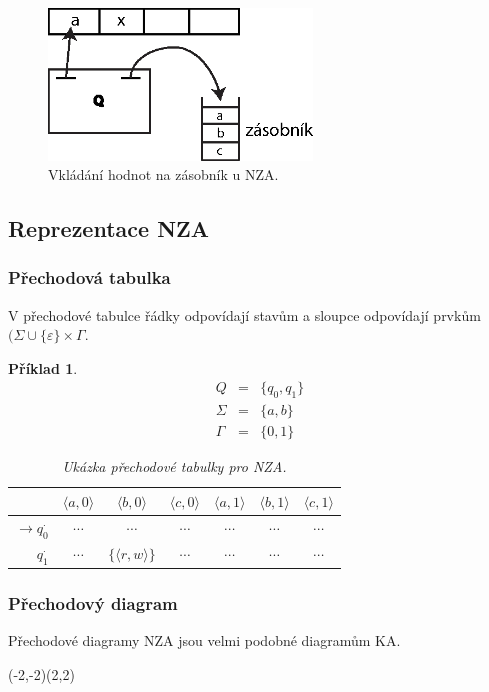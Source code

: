 \documentclass[10pt, a4paper, titlepage]{article}
\theoremstyle{note}
\newtheorem{priklad}{\textbf{Příklad}}
\begin{document}
\begin{figure}[ht]
\centering\includegraphics[width=7cm]{zasobnikovy-2.eps}
\caption{Vkládání hodnot na zásobník u NZA.}
\end{figure}

\subsection{Reprezentace NZA}

\subsubsection{Přechodová tabulka}
V přechodové tabulce řádky odpovídají stavům a sloupce odpovídají prvkům $(\Sigma \cup \lbrace \varepsilon \rbrace \times \Gamma$.
\begin{priklad}
\begin{eqnarray*}
Q &=& \lbrace q_0, q_1 \rbrace \\
\Sigma &=& \lbrace a, b \rbrace \\
\Gamma &=& \lbrace 0, 1 \rbrace
\end{eqnarray*}
\begin{table}[h]
\begin{center}
\begin{tabular}{ r || c | c | c | c | c | c}                   
 & $\langle a, 0 \rangle$ & $\langle b, 0 \rangle$ & $\langle c, 0 \rangle$ & $\langle a, 1 \rangle$ & $\langle b, 1 \rangle$ & $\langle c, 1 \rangle$ \\
\hline
$\rightarrow q_0^{\cdot}$ & $\cdots$ & $\cdots$ & $\cdots$ & $\cdots$ & $\cdots$ & $\cdots$ \\
$q_1^{\cdot}$ & $\cdots$ & $\lbrace \langle r, w \rangle \rbrace$ & $\cdots$ & $\cdots$ & $\cdots$ & $\cdots$
\end{tabular}
\end{center}
\caption{Ukázka přechodové tabulky pro NZA.}
\end{table}
\end{priklad}

\subsubsection{Přechodový diagram}
Přechodov\'e diagramy NZA jsou velmi podobn\'e diagramům KA.
\begin{center}
\begin{VCPicture}{(-2,-2)(2,2)}
\end{VCPicture}
\end{center}
\end{document}
